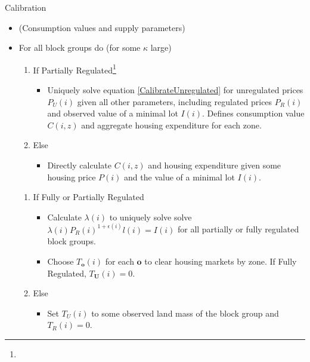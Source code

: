 \documentclass[12pt]{article}
\begin{document}
	\begin{algorithm}
		\caption{Calibration}
		
		
			\begin{itemize}
			\item[] (Consumption values and supply parameters)
			\item[] For all block groups do (for some $\kappa$ large)
			
				\begin{enumerate}
					\item[] If Partially Regulated\footnote{}
					
					\begin{itemize}
						\item[] Uniquely solve equation \eqref{CalibrateUnregulated} for unregulated prices $P_{U}(i)$ given all other parameters, including regulated prices $P_{R}(i)$ and observed value of a minimal lot $I(i)$. Defines consumption value $C(i, z)$ and aggregate housing expenditure for each zone.
					\end{itemize}
					
					\item[]Else 
					
					\begin{itemize}
						\item[] Directly calculate $C(i, z)$ and housing expenditure given some housing price $P(i)$ and the value of a minimal lot $I(i)$. 
					\end{itemize}
									
				\end{enumerate}
				
				\begin{enumerate}
					\item[] If Fully or Partially Regulated
					\begin{itemize}
						\item[] Calculate $\lambda(i)$ to uniquely solve solve $\lambda(i)P_{R}(i)^{1 + \epsilon(i)}l(i) = I(i)$ for all partially or fully regulated block groups.
						
						\item[] Choose $T_{\boldsymbol{o}}(i)$ for each $\boldsymbol{o}$ to clear housing markets by zone. If Fully Regulated, $T_{\boldsymbol{U}}(i) = 0$.
						
					\end{itemize}
					
					\item[] Else
					\begin{itemize}
						\item[] Set $T_{U}(i)$ to some observed land mass of the block group and $T_{R}(i) = 0$. 
						

\end{itemize}
\end{enumerate}
\end{itemize}
\end{algorithm}
\end{document}
